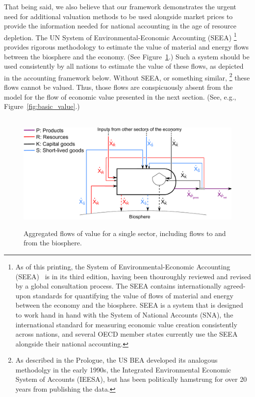 That being said, we also believe that our framework demonstrates the  
urgent need for additional valuation methods to be used
alongside market prices to provide the information
needed for national accounting in the age of resource depletion. 
The UN System of Environmental-Economic Accounting (SEEA)%
	\footnote{
	As of this printing, 
	the System of Environmental-Economic Accounting (SEEA)~\cite{UNSEEA2014}
	is in its third edition, having been thouroughly reviewed and revised 
	by a global consultation process. 
	The SEEA contains internationally agreed-upon standards for quantifying the 
	value of flows of material and energy between the economy and the biosphere. 
	SEEA is a system that is designed to 
	work hand in hand with the System of National Accounts (SNA), 
	the international standard for measuring economic value creation consistently across nations,
	and several OECD member states
	currently use the SEEA alongside their national accounting.
	} 
provides rigorous methodology to estimate the value 
of material and energy flows between the biosphere and the economy.
(See Figure~\ref{fig:basic_value_with_biosphere_flows}.)
Such a system should be used consistently by all
nations to estimate the value of these flows, 
as depicted in the accounting framework below.
Without SEEA, or something similar,%
	\footnote{
	As described in the Prologue, the US BEA developed
	its analogous methodolgy in the early 1990s, 
	the Integrated Environmental Economic System of Accounts (IEESA), 
	but has been politically hamstrung for
	over 20 years from publishing the data.
	}
these flows cannot be valued. 
Thus, those flows are conspicuously 
absent from the model for the flow of economic value presented in the next section.
(See, e.g., Figure~\ref{fig:basic_value}.)

\begin{figure}[ht!]
\centering\
\includegraphics[width=0.8\linewidth]{Part_2/Chapter_Values/images/PERKS_basic_unit_value_with_biosphere_flows.pdf}
\caption[Aggregated flows of value for a single sector including flows to and from the biosphere]{Aggregated flows of value for a single sector, including flows to and from the biosphere.}
\label{fig:basic_value_with_biosphere_flows}
\end{figure}


